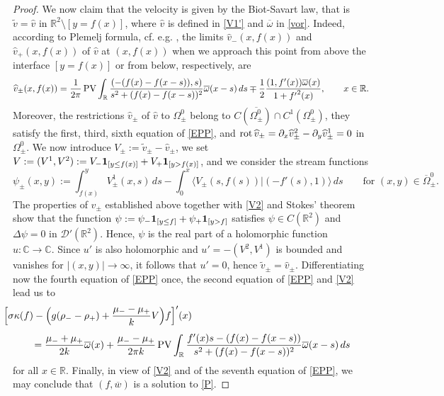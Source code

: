 \documentclass[11pt,reqno]{amsart}
\numberwithin{equation}{section}
\newcommand{\PV}{\mathop{\rm PV}\nolimits}
\newcommand{\0}{\Omega}
\newcommand{\p}{\partial}
\newcommand{\wt}{\widetilde}
\newcommand{\ov}{\overline}
\newcommand{\wh}{\widehat}
\newcommand{\C}{\mathbb{C}}
\newcommand{\R}{\mathbb{R}}
\numberwithin{equation}{section}
\begin{document}
\begin{proof}
We now claim that the velocity is given by the Biot-Savart law, that is $\wt v=\wh v$ in $\R^2\setminus [y=f(x)]$,
where $\wh v$ is defined in \eqref{V1'} and $\ov\omega$  in \eqref{vor}.
Indeed, according to Plemelj formula, cf. e.g. \cite{JKL93},  the limits  $\wh v_-(x,f(x))$ and $\wh v_+(x,f(x))$  of $\wh v$ at $(x,f(x))$ when we approach this point
from above the interface $[y=f(x)] $ or from below, respectively, are
\begin{align}
\wh v_\pm(x,f(x))=\frac{1}{2\pi}\PV\int_\R\frac{(-(f(x)-f(x-s)),s)}{ s^2+(f(x)-f(x-s))^2 }\ov\omega(x-s)\, ds \mp\frac{1}{2}\frac{(1,f'(x))\ov\omega(x)}{1+{f'}^2(x)},\qquad x\in\R.\label{V2}
\end{align}
Moreover,   the restrictions $\wh v_\pm$ of $\wh v$ to $\0_\pm^0$ belong to $ C(\ov{\0_\pm^0})\cap C^1({\0_\pm^0})$, they satisfy the first, third, sixth equation of \eqref{EPP},   and 
${\rm rot\,}\wh v_\pm=\p_x\wh v_\pm^2-\p_y\wh v_\pm^1=0$ in $\0_\pm^0$.
We now introduce  $V_\pm:=\wt v_\pm-\wh v_\pm$, we set  $V:=(V^1,V^2):=V_-{\bf 1}_{[y\leq f(x)]}+V_+{\bf 1}_{[y> f(x)]}$, and  we consider the stream functions
\[
\psi_\pm(x,y):=\int^{y}_{f(x)}V_\pm ^1(x,s)\, ds-\int_0^x  \langle V_\pm(s,f(s)) | (-f'(s),1)\rangle\, ds\qquad\text{for $(x,y)\in\ov \0_\pm^0.$}
\]
The properties of $\wh v_\pm$ established above together with \eqref{V2} and Stokes' theorem show that the function  
$\psi:=\psi_-{\bf 1}_{[y\leq f]}+\psi_+{\bf 1}_{[y>f]}$ satisfies $\psi\in C(\R^2)$ and $\Delta\psi=0$ in $\mathcal{D}'(\R^2)$. 
Hence, $\psi$ is the real part of a holomorphic function $u:\C\to\C$.
Since $u'$ is also holomorphic and $u'=-(V^2,V^1)$ is bounded and vanishes for $|(x,y)|\to\infty$, it follows that $u'=0$, hence $\wt v_\pm=\wh v_\pm$. 
Differentiating  now the fourth equation of \eqref{EPP} once, the second equation of \eqref{EPP} and \eqref{V2} lead us to
\begin{align*}
&\hspace{-1cm}\Big[\sigma\kappa(f)-\Big(g(\rho_--\rho_+)+\frac{\mu_--\mu_+}{k}V\Big) f\Big]'(x)\\[1ex]
&=\frac{\mu_-+\mu_+}{2k}\ov\omega(x)+ \frac{\mu_--\mu_+}{2\pi k}\PV\int_\R\frac{f'(x)s-(f(x)-f(x-s))}{ s^2+(f(x)-f(x-s))^2 }\ov\omega(x-s)\, ds 
\end{align*}
for all $x\in\R$.
Finally, in view of \eqref{V2} and of the seventh equation of \eqref{EPP}, we may conclude that $(f,\ov w)$ is a solution to  \eqref{P}.


\end{proof}
\end{document}
